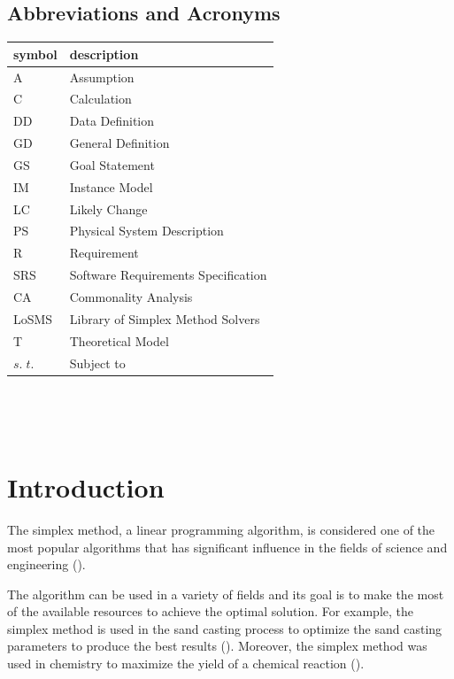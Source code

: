 \documentclass[12pt]{article}
\newcommand{\famname}{LoSMS} %
\begin{document}
\subsection{Abbreviations and Acronyms}

\renewcommand{\arraystretch}{1.2}
\begin{tabular}{l l} 
  \toprule		
  \textbf{symbol} & \textbf{description}\\
  \midrule 
  A & Assumption\\
  C & Calculation \\
  DD & Data Definition\\
  GD & General Definition\\
  GS & Goal Statement\\
  IM & Instance Model\\
  LC & Likely Change\\
  PS & Physical System Description\\
  R & Requirement\\
  SRS & Software Requirements Specification\\
  CA & Commonality Analysis\\
  \famname{} & Library of Simplex Method Solvers\\
  T & Theoretical Model\\
  $s.\;t.$ & Subject to\\
  \bottomrule
\end{tabular}\\

\newpage

\tableofcontents

~\newpage


\section{Introduction}

The simplex method, a linear programming algorithm, is considered one of the 
most popular algorithms that has significant influence in the fields of science 
and engineering (\cite{simplex-popularity}). 


The algorithm can be used in a variety of fields and its goal is to make the 
most of the available resources to achieve the optimal solution. For example, 
the simplex method is used in the sand casting process to optimize the sand 
casting parameters to produce the best results (\cite{sand-casting}). Moreover, 
the simplex method was used in chemistry to maximize the yield of a chemical 
reaction (\cite{chemistry}).
\end{document}
